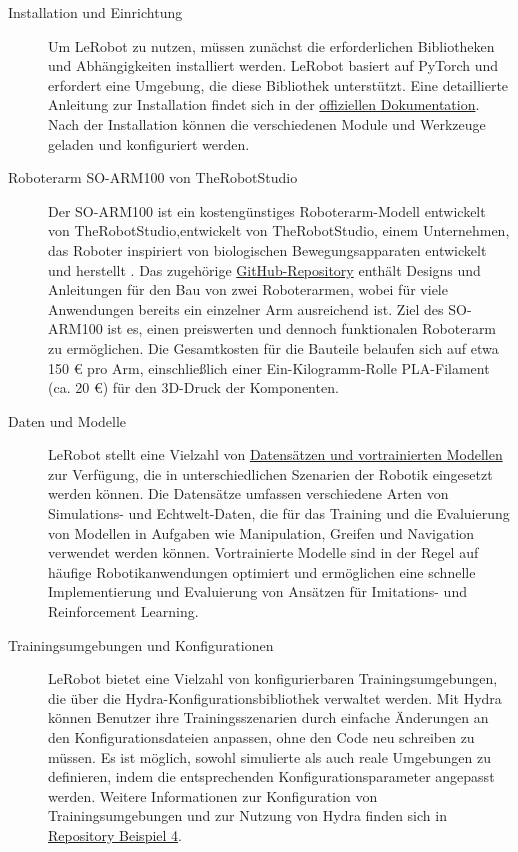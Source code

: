 \documentclass[a4paper, 12pt]{article}
\begin{document}
\begin{description}
	\item[Installation und Einrichtung] Um LeRobot zu nutzen, müssen zunächst die erforderlichen Bibliotheken und Abhängigkeiten installiert werden. LeRobot basiert auf PyTorch und erfordert eine Umgebung, die diese Bibliothek unterstützt. Eine detaillierte Anleitung zur Installation findet sich in der \href{https://github.com/huggingface/lerobot}{offiziellen Dokumentation}. Nach der Installation können die verschiedenen Module und Werkzeuge geladen und konfiguriert werden.

	\item[Roboterarm SO-ARM100 von TheRobotStudio] Der SO-ARM100 ist ein kostengünstiges Roboterarm-Modell entwickelt von TheRobotStudio,entwickelt von TheRobotStudio, einem Unternehmen, das Roboter inspiriert von biologischen Bewegungsapparaten entwickelt und herstellt \cite{the_robot_studio}. Das zugehörige \href{https://github.com/TheRobotStudio/SO-ARM100}{GitHub-Repository} enthält Designs und Anleitungen für den Bau von zwei Roboterarmen, wobei für viele Anwendungen bereits ein einzelner Arm ausreichend ist. Ziel des SO-ARM100 ist es, einen preiswerten und dennoch funktionalen Roboterarm zu ermöglichen. Die Gesamtkosten für die Bauteile belaufen sich auf etwa 150 € pro Arm, einschließlich einer Ein-Kilogramm-Rolle PLA-Filament (ca. 20 €) für den 3D-Druck der Komponenten. \cite{so_arm100}

	\item[Daten und Modelle] LeRobot stellt eine Vielzahl von \href{https://huggingface.co/lerobot}{Datensätzen und vortrainierten Modellen} zur Verfügung, die in unterschiedlichen Szenarien der Robotik eingesetzt werden können. Die Datensätze umfassen verschiedene Arten von Simulations- und Echtwelt-Daten, die für das Training und die Evaluierung von Modellen in Aufgaben wie Manipulation, Greifen und Navigation verwendet werden können. Vortrainierte Modelle sind in der Regel auf häufige Robotikanwendungen optimiert und ermöglichen eine schnelle Implementierung und Evaluierung von Ansätzen für Imitations- und Reinforcement Learning. 

	\item[Trainingsumgebungen und Konfigurationen] LeRobot bietet eine Vielzahl von konfigurierbaren Trainingsumgebungen, die über die Hydra-Konfigurationsbibliothek verwaltet werden. Mit Hydra können Benutzer ihre Trainingsszenarien durch einfache Änderungen an den Konfigurationsdateien anpassen, ohne den Code neu schreiben zu müssen. Es ist möglich, sowohl simulierte als auch reale Umgebungen zu definieren, indem die entsprechenden Konfigurationsparameter angepasst werden. Weitere Informationen zur Konfiguration von Trainingsumgebungen und zur Nutzung von Hydra finden sich in \href{https://github.com/huggingface/lerobot/blob/main/examples/4_train_policy_with_script.md}{Repository Beispiel 4}.


\end{description}
\end{document}
